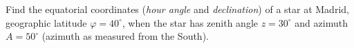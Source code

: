 Find the equatorial coordinates (\emph{hour angle} and \emph{declination}) of
a star at Madrid, geographic latitude $\varphi = 40^\circ$, when the star has
zenith angle $z = 30^\circ$ and azimuth $A = 50^\circ$ (azimuth as measured
from the South).

